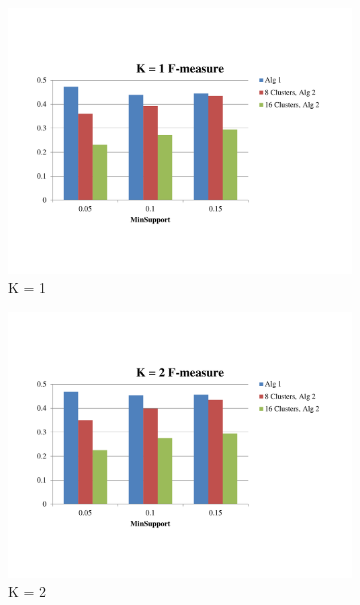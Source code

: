 \begin{figure}[b!]
        \centering
        \begin{subfigure}[b]{0.3\textwidth}
         \includegraphics[width=\textwidth]{F-measure1}
         \caption{K = 1}
         \label{Fig:F-measure1}
        \end{subfigure}
        \begin{subfigure}[b]{0.3\textwidth}
         \includegraphics[width=\textwidth]{F-measure2}
         \caption{K = 2}
         \label{Fig:F-measure2}
        \end{subfigure}
        \begin{subfigure}[b]{0.3\textwidth}

\end{subfigure}
\end{figure}
